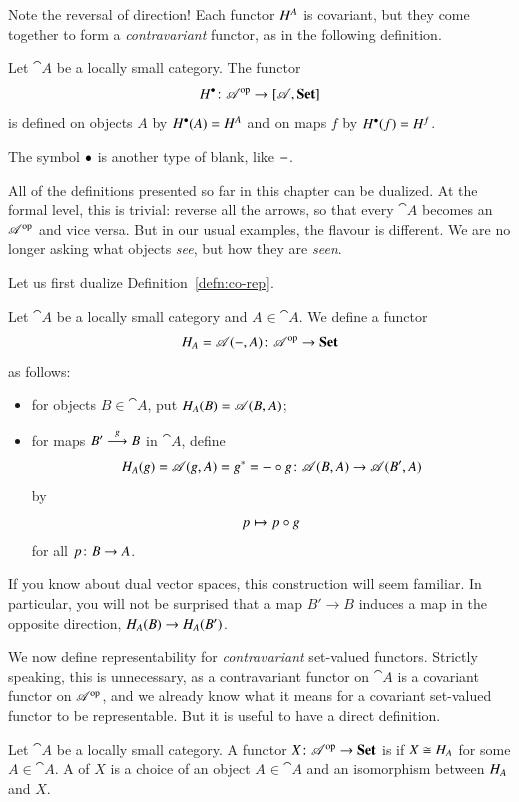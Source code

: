 Note the reversal of direction!  Each functor $H^A$ is covariant, but they
come together to form a \emph{contravariant} functor, as in the following
definition.

\begin{defn}
Let $\cat{A}$ be a locally small category.  The functor
\[
\h^\bl\from \cat{A}^\op \to \ftrcat{\cat{A}}{\Set}%
%
\ntn{hom-out-blank}
%
\]
is defined on objects $A$ by $H^\bullet(A) = H^A$ and on maps $f$ by $H^\bullet(f)
= H^f$.
\end{defn}

The symbol $\bullet$ is another type of blank, like $-$.

All of the definitions presented so far in this chapter can be dualized.
At the formal level, this is trivial: reverse all the arrows, so that every
$\cat{A}$ becomes an $\mathscr{A}^{\mathrm{op}}$ and vice versa.  But in our usual
examples, the flavour is different.  We are no longer asking what objects
\emph{see}, but how they are \emph{seen}.

Let us first dualize Definition~\ref{defn:co-rep}.

\begin{defn}
Let $\cat{A}$ be a locally small category and $A \in \cat{A}$.  We define a
functor
\[
\h_A = \cat{A}(\dashbk, A)\from \cat{A}^\op \to \Set%
%
\ntn{hom-in}
%
\]
as follows:
%
\begin{itemize}
\item
for objects $B \in \cat{A}$, put $H_A(B) = \mathscr{A}(B, A)$;

\item
for maps $B' \stackrel{g}{\longrightarrow} B$ in $\cat{A}$, define
\[
\h_A(g) = \cat{A}(g, A) = g^* = \dashbk \of g\from
\cat{A}(B, A) \to \cat{A}(B', A)
\]
by
\[
p
\mapsto
p \mathbin{\circ} g
\]
for all $p\from B \to A$.
\end{itemize}
\end{defn}

If you know about dual vector spaces, this construction will seem familiar.
In particular, you will not be surprised that a map $B' \to B$ induces a
map in the opposite direction, $H_A(B) \to H_A(B')$.

We now define representability for \emph{contravariant} set-valued
functors.  Stri\-ctly speaking, this is unnecessary, as a contravariant
functor on $\cat{A}$ is a covariant functor on $\mathscr{A}^{\mathrm{op}}$, and we
already know what it means for a covariant set-valued functor to be
representable.  But it is useful to have a direct definition.

\begin{defn}
Let $\cat{A}$ be a locally small category.  A functor $X\from \cat{A}^\op \to
\Set$ is %
%
%
if $X \cong H_A$ for some $A \in \cat{A}$.  A %
%
%
of $X$ is a choice of an object $A \in \cat{A}$ and an isomorphism between
$H_A$ and $X$.
\end{defn}

